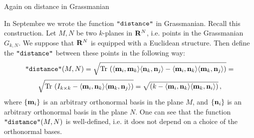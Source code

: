 

\baselineskip=14pt
\def\vare {\varepsilon}
\def\t {\tilde}
\def\a {\alpha}
\def\K {{\bf K}}
\def\N {{\bf N}}
\def\C {{\cal C}}
\def\L {{\cal L}}
\def\E {{\cal E}}
\def\s {{\sigma}}
\def\S {{\Sigma}}
\def\p{\partial}
\def\vare{{\varepsilon}}
\def\Q {{\bf Q}}
\def\D {{\cal D}}
\def\G {{\Gamma}}
\def\Z {{\bf Z}}
\def\R  {{\bf R}}
\def\l {\lambda}
\def\ll {{\bf l}}
\def\degree {{\bf {\rm degree}\,\,}}
\def \finish {${\,\,\vrule height1mm depth2mm width 8pt}$}
\def \m {\medskip}
\def\p {\partial}
\def\r {{\bf r}}
\def\pt {{\bf p}}
\def\v {{\bf v}}
\def\n {{\bf n}}
\def\t {{\bf t}}
\def\b {{\bf b}}
\def\c {{\bf c }}
\def\e{{\bf e}}
\def\ac {{\bf a}}
\def \X   {{\bf X}}
\def \Y   {{\bf Y}}
\def \x   {{\bf x}}
\def \y   {{\bf y}}
\def\w {{\omega}}
\def \Tr  {{\rm Tr\,}}
\def\dim {{\rm dim\,\,}}
\def\t {{\tilde}} 
\def\dist {{\hbox{\tt "distance"}}}

\centerline {Again on distance in Grassmanian}

\def\m {{\bf m}}
\def\n {{\bf n}}

In Septembre we wrote the function $\dist$ in Grassmanian.
Recall this construction.
  Let  $M,N$ be two $k$-planes in $\R^N$, i.e. points
in the Grassmanian $G_{k,N}$.  We suppose that $\R^N$ is equipped
with a Euclidean structure. Then define the $\dist$ between these
points in the following way:
                $$
\dist(M,N)=
                     \sqrt 
                   {
                     \Tr
                      \left(
  \langle \m_i,\m_k\rangle\langle \n_k,\n_j\rangle
 -\langle \m_i,\n_k\rangle\langle \m_k,\n_j\rangle
                     \right)
                 }
              =
                   $$
                   $$
                     \sqrt 
                   {
                     \Tr
                      \left(
                         I_{k\times k}
 -\langle \m_i,\n_k\rangle\langle \m_k,\n_j\rangle
                     \right)
                 }=
                     \sqrt
                 {
                      \left(
                   k
 -\langle \m_i,\n_k\rangle\langle \m_k,\n_i\rangle
                     \right)
                 }\,,
                  $$ 
where  $\{\m_i\}$ is an arbitrary orthonormal basis in the plane $M$,
and $\{\n_i\}$ is an arbitrary orthonormal basis in the plane $N$.
One can see that the function  $\dist (M,N)$ is well-defined,
i.e. it does not depend on a choice of the orthonormal bases.

\medskip


